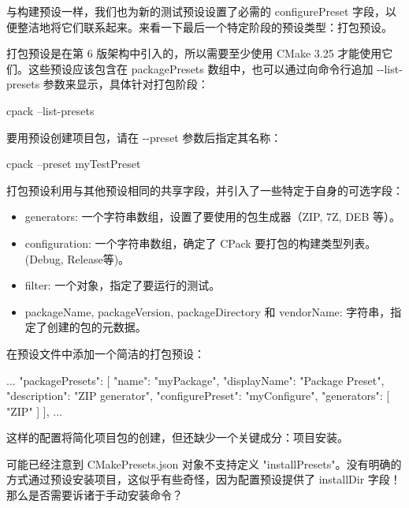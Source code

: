 与构建预设一样，我们也为新的测试预设设置了必需的 configurePreset 字段，以便整洁地将它们联系起来。来看一下最后一个特定阶段的预设类型：打包预设。


打包预设是在第 6 版架构中引入的，所以需要至少使用 CMake 3.25 才能使用它们。这些预设应该包含在 packagePresets 数组中，也可以通过向命令行追加 -{}-list-presets 参数来显示，具体针对打包阶段：

\begin{shell}
cpack --list-presets
\end{shell}

要用预设创建项目包，请在 -{}-preset 参数后指定其名称：

\begin{shell}
cpack --preset myTestPreset
\end{shell}

打包预设利用与其他预设相同的共享字段，并引入了一些特定于自身的可选字段：

\begin{itemize}
\item
generators: 一个字符串数组，设置了要使用的包生成器（ZIP, 7Z, DEB 等）。

\item
configuration: 一个字符串数组，确定了 CPack 要打包的构建类型列表。 (Debug, Release等)。

\item
filter:  一个对象，指定了要运行的测试。

\item
packageName, packageVersion, packageDirectory 和 vendorName: 字符串，指定了创建的包的元数据。
\end{itemize}

在预设文件中添加一个简洁的打包预设：


\begin{json}
...
    "packagePresets": [
        {
            "name": "myPackage",
            "displayName": "Package Preset",
            "description": "ZIP generator",
            "configurePreset": "myConfigure",
            "generators": [
            "ZIP"
            ]
        }
    ],
...
\end{json}

这样的配置将简化项目包的创建，但还缺少一个关键成分：项目安装。


可能已经注意到 CMakePresets.json 对象不支持定义 "installPresets"。没有明确的方式通过预设安装项目，这似乎有些奇怪，因为配置预设提供了 installDir 字段！那么是否需要诉诸于手动安装命令？

